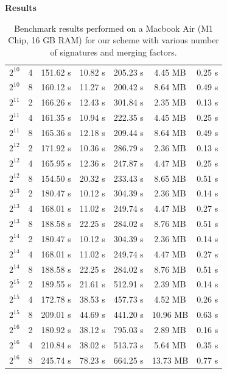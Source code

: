 \documentclass[final]{beamer}
\newlength{\colwidth}
\begin{document}
\begin{frame}[t]
\begin{columns}[t]
\begin{column}{\colwidth}
\begin{block}{\fontsize{42}{48}\selectfont\bfseries Results}
\begin{minipage}[t]{0.48\linewidth}
\begin{table}[H]
\begin{tabular}{|c|c|c|c|c|c|c|}
$2^{10}$ & 4 & 151.62 s & 10.82 s & 205.23 s & 4.45 MB & 0.25 s \\
$2^{10}$ & 8 & 160.12 s & 11.27 s & 200.42 s & 8.64 MB & 0.49 s \\
\hline
$2^{11}$ & 2 & 166.26 s & 12.43 s & 301.84 s & 2.35 MB & 0.13 s \\
$2^{11}$ & 4 & 161.35 s & 10.94 s & 222.35 s & 4.45 MB & 0.25 s \\
$2^{11}$ & 8 & 165.36 s & 12.18 s & 209.44 s & 8.64 MB & 0.49 s \\
\hline
$2^{12}$ & 2 & 171.92 s & 10.36 s & 286.79 s & 2.36 MB & 0.13 s \\
$2^{12}$ & 4 & 165.95 s & 12.36 s & 247.87 s & 4.47 MB & 0.25 s \\
$2^{12}$ & 8 & 154.50 s & 20.32 s & 233.43 s & 8.65 MB & 0.51 s \\
\hline
$2^{13}$ & 2 & 180.47 s & 10.12 s & 304.39 s & 2.36 MB & 0.14 s \\
$2^{13}$ & 4 & 168.01 s & 11.02 s & 249.74 s & 4.47 MB & 0.27 s \\
$2^{13}$ & 8 & 188.58 s & 22.25 s & 284.02 s & 8.76 MB & 0.51 s \\
\hline
$2^{14}$ & 2 & 180.47 s & 10.12 s & 304.39 s & 2.36 MB & 0.14 s \\
$2^{14}$ & 4 & 168.01 s & 11.02 s & 249.74 s & 4.47 MB & 0.27 s \\
$2^{14}$ & 8 & 188.58 s & 22.25 s & 284.02 s & 8.76 MB & 0.51 s \\
\hline
$2^{15}$ & 2 & 189.55 s & 21.61 s & 512.91 s & 2.39 MB & 0.14 s \\
$2^{15}$ & 4 & 172.78 s & 38.53 s & 457.73 s & 4.52 MB & 0.26 s \\
$2^{15}$ & 8 & 209.01 s & 44.69 s & 441.20 s & 10.96 MB & 0.63 s \\
\hline
$2^{16}$ & 2 & 180.92 s & 38.12 s & 795.03 s & 2.89 MB & 0.16 s \\
$2^{16}$ & 4 & 210.84 s & 38.02 s & 513.73 s & 5.64 MB & 0.35 s \\
$2^{16}$ & 8 & 245.74 s & 78.23 s & 664.25 s & 13.73 MB & 0.77 s \\
\hline
\end{tabular}
\vskip3mm
\caption{Benchmark results performed on a Macbook Air (M1 Chip, 16 GB RAM) for our scheme with various number of signatures and merging factors.}
\label{tab:BenchmarkResults}
\end{table}
\end{minipage}


    \end{block}




\end{column}
\end{columns}
\end{frame}
\end{document}
